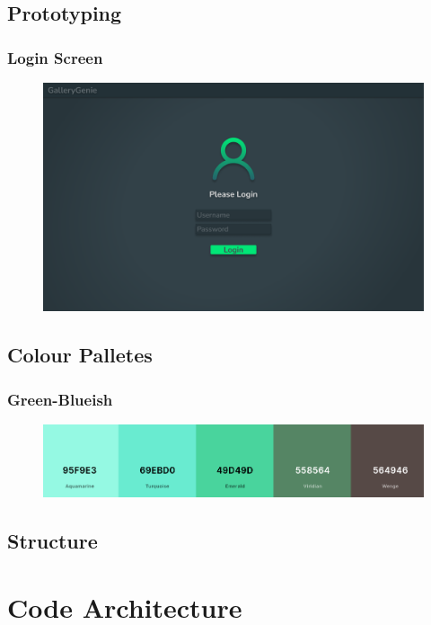 \documentclass[a4paper,12pt]{article}
\begin{document}
\subsection{Prototyping}
\subsubsection{Login Screen}

\begin{figure}[!h]
	\includegraphics[width=\linewidth]{../imgs/Login.png}
\end{figure}

\newpage
\subsection{Colour Palletes}
\subsubsection{Green-Blueish}
\begin{figure}[!h]
	\includegraphics[width=\linewidth]{../imgs/pallete1.png}
\end{figure}
\subsection{Structure}


\section{Code Architecture}
\end{document}
